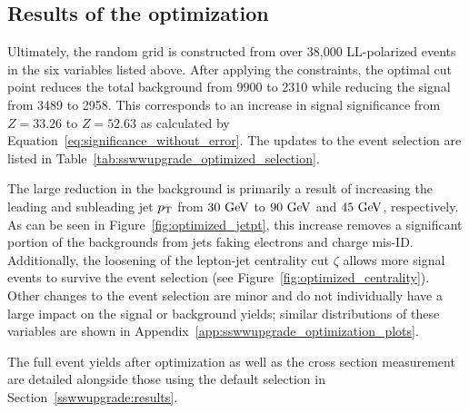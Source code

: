 %
\subsection{Results of the optimization}\label{sswwupgrade:opt_results}
Ultimately, the random grid is constructed from over 38,000 LL-polarized \ssww events in the six variables listed above.
After applying the constraints, the optimal cut point reduces the total background from 9900 to 2310 while reducing the signal from 3489 to 2958.
This corresponds to an increase in signal significance from $Z = 33.26$ to $Z = 52.63$ as calculated by Equation~\ref{eq:significance_without_error}.
The updates to the event selection are listed in Table~\ref{tab:sswwupgrade_optimized_selection}. %

The large reduction in the background is primarily a result of increasing the leading and subleading jet $p_{\mathrm{T}}$ from $30\gev$ to $90\gev$ and $45\gev$, respectively.
As can be seen in Figure~\ref{fig:optimized_jetpt}, this increase removes a significant portion of the backgrounds from jets faking electrons and charge mis-ID.
Additionally, the loosening of the lepton-jet centrality cut $\zeta$ allows more signal events to survive the event selection (see Figure~\ref{fig:optimized_centrality}).
Other changes to the event selection are minor and do not individually have a large impact on the signal or background yields; similar distributions of these variables are shown in Appendix~\ref{app:sswwupgrade_optimization_plots}.

The full event yields after optimization as well as the cross section measurement are detailed alongside those using the default selection in Section~\ref{sswwupgrade:results}.

